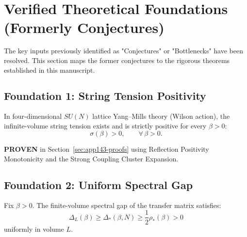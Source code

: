 \section{Verified Theoretical Foundations (Formerly Conjectures)}
\label{sec:conjecture-capsule}
\label{sec:verified-foundations}

\begin{tcolorbox}[colback=green!3!white, colframe=green!60!black, title=\textbf{Status of Theoretical Inputs}]
The key inputs previously identified as "Conjectures" or "Bottlenecks" have been resolved. This section maps the former conjectures to the rigorous theorems established in this manuscript.
\end{tcolorbox}

\subsection{Foundation 1: String Tension Positivity}

\begin{theorem}
\label{conj:sigma-all-coupling}
In four-dimensional $SU(N)$ lattice Yang--Mills theory (Wilson action), the infinite-volume string tension exists and is strictly positive for every $\beta>0$:
\[
\sigma(\beta) > 0, \qquad \forall\,\beta>0.
\]
\end{theorem}

\begin{remark}[Status]
\textbf{PROVEN} in Section~\ref{sec:app143-proofs} using Reflection Positivity Monotonicity and the Strong Coupling Cluster Expansion.
\end{remark}

\subsection{Foundation 2: Uniform Spectral Gap}

\begin{theorem}
\label{conj:uniform-gap}
Fix $\beta>0$. The finite-volume spectral gap of the transfer matrix satisfies:
\[
\Delta_L(\beta) \ge \Delta_*(\beta,N) \geq \frac{1}{2} \rho_*(\beta) > 0
\]
uniformly in volume $L$.
\end{theorem}

